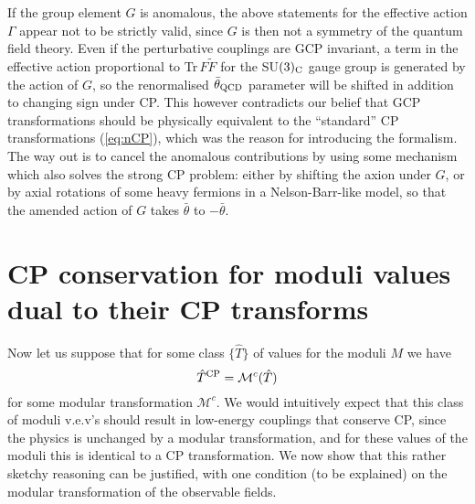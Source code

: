 \documentclass[a4paper,12pt]{article}
\begin{document}
If the group element $G$ is anomalous, the above statements for the effective action $\Gamma$ appear not to be strictly valid, since $G$ is then not a symmetry of the quantum field theory. Even if the perturbative couplings are GCP invariant, a term in the effective action proportional to Tr$\,F\tilde{F}$ for the SU$(3)_{\rm C}$ gauge group is generated by the action of $G$, so the renormalised $\bar{\theta}_{\rm QCD}$ parameter will be shifted in addition to changing sign under CP. This however contradicts our belief that GCP transformations should be physically equivalent to the ``standard'' CP transformations (\ref{eq:nCP}), which was the reason for introducing the formalism. The way out is to cancel the anomalous contributions by using some mechanism which also solves the strong CP problem: either by shifting the axion under $G$, or by axial rotations of some heavy fermions in a Nelson-Barr-like model, so that the amended action of $G$ takes $\bar{\theta}$ to $-\bar{\theta}$.

\section{CP conservation for moduli values dual to their CP transforms}
Now let us suppose that for some class $\{ \hat{T}\}$ of values for the moduli $M$ we have 
\begin{equation}
	\hat{T}^{\rm CP} = \mathcal{M}^{c}(\hat{T}) \label{eq:modcond}
\end{equation}
for some modular transformation $\mathcal{M}^c$. We would intuitively expect that this class of moduli v.e.v's should result in low-energy couplings that conserve CP, since the physics is unchanged by a modular transformation, and for these values of the moduli this is identical to a CP transformation. We now show that this rather sketchy reasoning can be justified, with one condition (to be explained) on the modular transformation of the observable fields.
\end{document}
